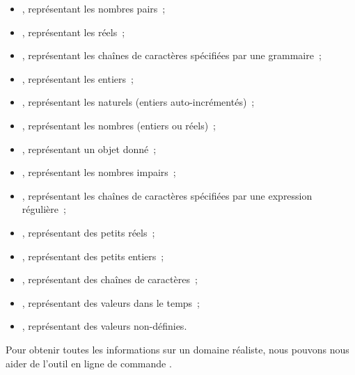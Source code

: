 \begin{itemize}
\item {}, représentant les nombres pairs~;

\item {}, représentant les réels~;

\item {}, représentant les chaînes de caractères spécifiées par une
grammaire~;

\item {}, représentant les entiers~;

\item {}, représentant les naturels (entiers auto-incrémentés)~;

\item {}, représentant les nombres (entiers ou réels)~;

\item {}, représentant un objet donné~;

\item {}, représentant les nombres impairs~;

\item {}, représentant les chaînes de caractères spécifiées par une
expression régulière~;

\item {}, représentant des petits réels~;

\item {}, représentant des petits entiers~;

\item {}, représentant des chaînes de caractères~;

\item {}, représentant des valeurs dans le temps~;

\item {}, représentant des valeurs non-définies.

\end{itemize}

Pour obtenir toutes les informations sur un domaine réaliste, nous pouvons nous
aider de l'outil en ligne de commande .

